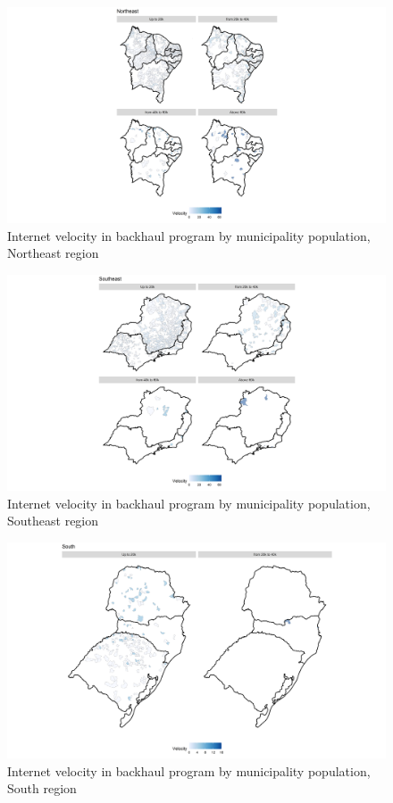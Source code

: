 \documentclass[
  12pt,
]{article}
\begin{document}
\begin{figure}
\centering
\includegraphics{artigo1_files/figure-latex/mapa2-1.png}
\caption{Internet velocity in backhaul program by municipality
population, Northeast region \label{fig:1.2}}
\end{figure}

\begin{figure}
\centering
\includegraphics{artigo1_files/figure-latex/mapa3-1.png}
\caption{Internet velocity in backhaul program by municipality
population, Southeast region \label{fig:1.3}}
\end{figure}

\begin{figure}
\centering
\includegraphics{artigo1_files/figure-latex/mapa4-1.png}
\caption{Internet velocity in backhaul program by municipality
population, South region \label{fig:1.4}}
\end{figure}
\end{document}
